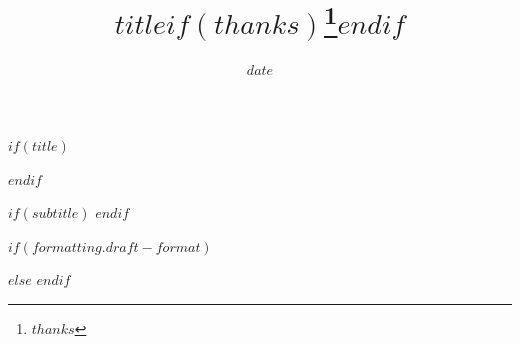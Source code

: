 $if(title)$
\title{$title$$if(thanks)$\thanks{$thanks$}$endif$}
$endif$

$if(subtitle)$
\makeatletter
\providecommand{\subtitle}[1]{\apptocmd{\@title}{\par {\large #1 \par}}{}{}}
\makeatother
\subtitle{$subtitle$}
$endif$

\newcommand{\myauthors}{%
$for(by-author)$%
\textbf{$it.name.literal$}%
$if(it.orcid)$~\orcidlink{$it.orcid$}$endif$%
\textsuperscript{$for(it.affiliations)$$it.number$$sep$,$endfor$}%
$if(it.attributes.corresponding)$\textsuperscript{*}$endif$%
$if(it.acknowledgements)$\thanks{$it.acknowledgements$}$endif$%
$sep$, %
$endfor$%
}

\newcommand{\myaffiliations}{%
$for(by-affiliation)$%
\textsuperscript{$it.number$} $it.name$%
$sep$\\ %
$endfor$%
}

\newcommand{\myemail}{%
$for(by-author)$%
$if(it.attributes.corresponding)$%
\textsuperscript{*}Correspondence: \texttt{$it.email$}%
$endif$%
$endfor$%
}

\makeatletter
\renewcommand{\maketitle}{%
  \newpage
  \null
  \vskip 1em%
  {\raggedright
    \let \footnote \thanks
    \renewcommand{\thefootnote}{\fnsymbol{footnote}}
    {\LARGE \bfseries \sffamily \@title \par}%
    \vskip 1em%
    {\large
      \lineskip .5em%
      \noindent\myauthors\par}%
    \vskip 1em%
    {\footnotesize \myaffiliations \par}%
    \vskip 0.5em%
    {\footnotesize \myemail \par}%
  }%
  \par
  \vskip 1em}
\makeatother

\date{$date$}

$if(formatting.draft-format)$
\usepackage[nolists,noheads,markers]{endfloat}
$else$
\singlespacing
$endif$